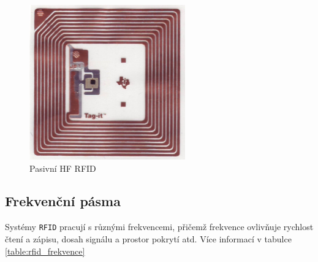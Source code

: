 \documentclass[czech,BP]{thesiskiv}
\begin{document}
\begin{figure}[H]
   		 	\centering
			\includegraphics[width=0.6\textwidth]{../images/rfid_smart_label.jpg}	
			\caption{Pasivní HF RFID}
    		\label{fig:rfidsmartlabel}
		\end{figure}

\newpage
\subsection{Frekvenční pásma}
Systémy \texttt{RFID} pracují s různými frekvencemi, přičemž frekvence ovlivňuje rychlost čtení a zápisu, dosah signálu a prostor pokrytí atd.
Více informací v tabulce \ref{table:rfid_frekvence}
\end{document}
